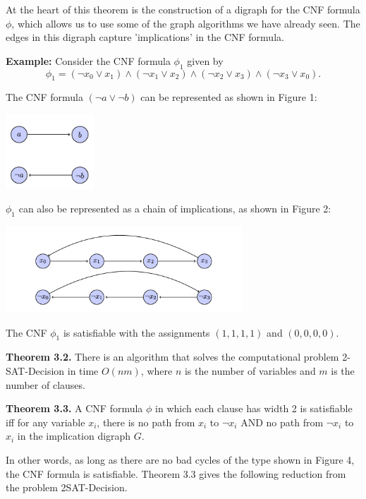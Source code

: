 \documentclass[10pt,landscape]{article}
\begin{document}
\begin{multicols*}{3}
At the heart of this theorem is the construction of a digraph for the CNF formula $\phi$, which allows us to use some of the graph algorithms we have already seen. The edges in this digraph capture 'implications' in the CNF formula.

\textbf{Example:} Consider the CNF formula $\phi_1$ given by
\[
\phi_1 = (\neg x_0 \lor x_1) \land (\neg x_1 \lor x_2) \land (\neg x_2 \lor x_3) \land (\neg x_3 \lor x_0).
\]

The CNF formula $(\neg a \lor \neg b)$ can be represented as shown in Figure 1:

\begin{minipage}{\linewidth}
            \centering
\includegraphics[width=1.3in]{figures/graph1.png}
        \end{minipage}


$\phi_1$ can also be represented as a chain of implications, as shown in Figure 2:

\begin{minipage}{\linewidth}
            \centering
\includegraphics[width=3.5in]{figures/graph2.png}
        \end{minipage}

The CNF $\phi_1$ is satisfiable with the assignments $(1, 1, 1, 1)$ and $(0, 0, 0, 0)$.

\smallskip

\textbf{Theorem 3.2.} There is an algorithm that solves the computational problem 2-SAT-Decision in
time $O(nm)$, where $n$ is the number of variables and $m$ is the number of clauses.

\textbf{Theorem 3.3.} A CNF formula $\phi$ in which each clause has width 2 is satisfiable iff for any variable $x_i$, there is no path from $x_i$ to $\neg x_i$ AND no path from $\neg x_i$ to $x_i$ in the implication digraph $G$.

In other words, as long as there are no bad cycles of the type shown in Figure 4, the CNF formula is satisfiable. Theorem 3.3 gives the following reduction from the problem 2SAT-Decision.


\end{multicols*}
\end{document}
